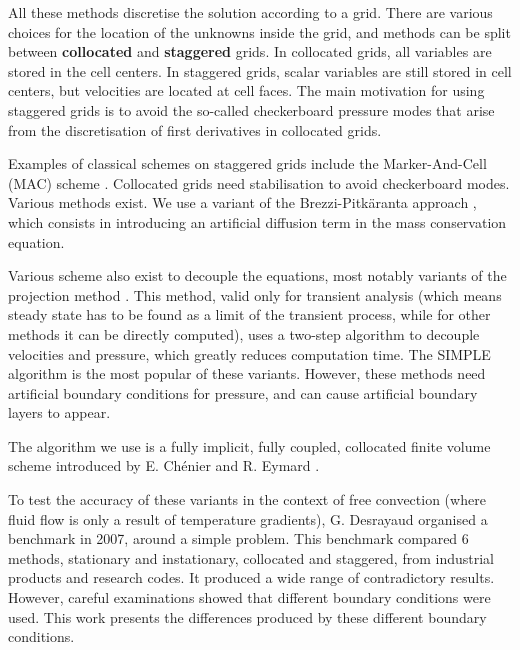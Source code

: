 \documentclass[12pt]{article}
\begin{document}
All these methods discretise the solution according to a grid. There
are various choices for the location of the unknowns inside the grid,
and methods can be split between {\bf collocated} and {\bf staggered}
grids. In collocated grids, all variables are stored in the cell
centers. In staggered grids, scalar variables are still stored in cell
centers, but velocities are located at cell faces. The main motivation
for using staggered grids is to avoid the so-called checkerboard
pressure modes that arise from the discretisation of first derivatives
in collocated grids.

Examples of classical schemes on staggered grids include the
Marker-And-Cell (MAC) scheme
\cite{har-65-num,Pat-80-num,har-65-num,nic-92-ana,cho-97-ana,cho-97-mac}. Collocated
grids need stabilisation to avoid checkerboard modes. Various methods
exist. We use a variant of the Brezzi-Pitk{\"a}ranta approach
\cite{mat-97-apr,brezzip,brezzip2}, which consists in introducing an
artificial diffusion term in the mass conservation equation.

Various scheme also exist to decouple the equations, most notably
variants of the projection method \cite{mat-97-pre}. This method,
valid only for transient analysis (which means steady state has to be
found as a limit of the transient process, while for other methods it
can be directly computed), uses a two-step algorithm to decouple
velocities and pressure, which greatly reduces computation time. The
SIMPLE algorithm is the most popular of these variants. However, these
methods need artificial boundary conditions for pressure, and can
cause artificial boundary layers to appear.

The algorithm we use is a fully implicit, fully coupled, collocated
finite volume scheme introduced by E. Chénier and R. Eymard
\cite{che-09-col,che-08-col,che-06-num}.

To test the accuracy of these variants in the context of free
convection (where fluid flow is only a result of temperature
gradients), G. Desrayaud organised a benchmark in 2007, around a
simple problem. This benchmark compared 6 methods, stationary and
instationary, collocated and staggered, from industrial products and
research codes. It produced a wide range of contradictory
results. However, careful examinations showed that different boundary
conditions were used. This work presents the differences produced by
these different boundary conditions.

\end{document}
